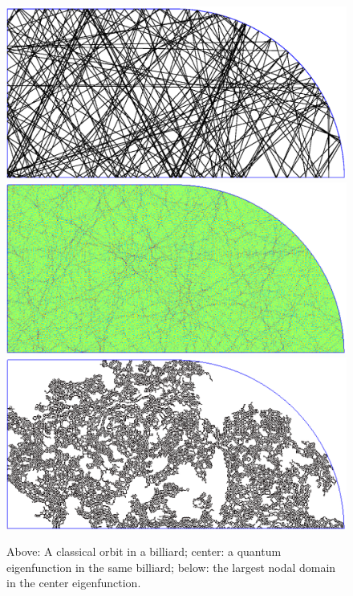 \documentclass{report}
\begin{document}
\begin{figure}
  \begin{center}
    \includegraphics[width=\textwidth]{figs/classical/stadium_orbit.eps}
    \linebreak
    \includegraphics[width=\textwidth]{figs/classical/stadium_eigenfunction.eps}
    \linebreak
    \includegraphics[width=\textwidth]{figs/classical/stadium_eigenfunction_largest_nodal_domain.eps}
    \caption{Above: A classical orbit in a billiard; center: a quantum eigenfunction in the same billiard; below: the largest nodal domain in the center eigenfunction.}
    \label{fig:classical_vs_quantum}
  \end{center}
\end{figure}
\end{document}

